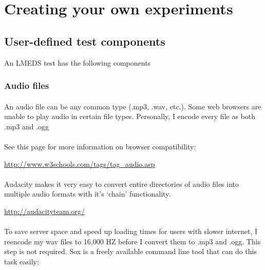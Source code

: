 
\section{Creating your own experiments}

\subsection{User-defined test components}

An LMEDS test has the following components

\subsubsection{Audio files}

\paragraph{}
An audio file can be any common type (.mp3, .wav, etc.).   Some web browsers are unable to play audio in certain file types.  Personally, I encode every file as both .mp3 and .ogg

\paragraph{}
See this page for more information on browser compatibility:

\url{http://www.w3schools.com/tags/tag\_audio.asp}

\paragraph{}
Audacity makes it very easy to convert entire directories of audio files into multiple audio formats with it's `chain' functionality.  

\url{http://audacityteam.org/}

\paragraph{}
To save server space and speed up loading times for users with slower internet, I reencode my wav files to 16,000 HZ before I convert them to .mp3 and .ogg.  This step is not required.  Sox is a freely available command line tool that can do this task easily:

